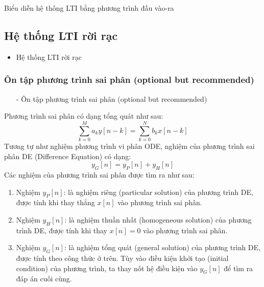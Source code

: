 \documentclass[8pt]{beamer}
\begin{document}
\begin{frame}{Biểu diễn hệ thống LTI bằng phương trình đầu vào-ra}
\subsection{Hệ thống LTI rời rạc}
\begin{itemize}
	\item Hệ thống LTI rời rạc
\end{itemize}
\subsubsection{Ôn tập phương trình sai phân (optional but recommended)}
\begin{itemize}
	\item[-] Ôn tập phương trình sai phân (optional but recommended)
\end{itemize}
Phương trình sai phân có dạng tổng quát như sau:
$$\sum_{k=0}^{M}a_{k}y[n-k]=\sum_{k=0}^{N}b_{k}x[n-k]$$
Tương tự như nghiệm phương trình vi phân ODE, nghiệm của phương trình sai phân DE (Difference Equation) có dạng: $$y_{G}[n]=y_{P}[n]+y_{H}[n]$$
Các nghiệm của phương trình sai phân được tìm ra như sau:
\begin{enumerate}
	\item Nghiệm $y_{P}[n]$: là nghiệm riêng (particular solution) của phương trình DE, được tính khi thay thẳng $x[n]$ vào phương trình sai phân.
	\item Nghiệm $y_{H}[n]$: là nghiệm thuần nhất (homogeneous solution) của phương trình DE, được tính khi thay \alert{$x[n]=0$} vào phương trình sai phân.
	\item Nghiệm $y_{G}[n]$: là nghiệm tổng quát (general solution) của phương trình DE, được tính theo công thức ở trên. Tùy vào điều kiện khởi tạo (initial condition) của phương trình, ta thay nốt hệ điều kiện vào $y_{G}[n]$ để tìm ra đáp án cuối cùng.
\end{enumerate}
\end{frame}
\end{document}
